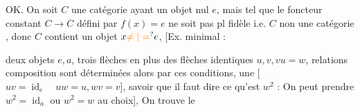 
OK. On soit \(C\) une catégorie ayant un objet nul  \(e\), mais tel que le foncteur constant  \(C\longrightarrow C\) défini par \(f(x)=e\) ne soit pas pl fidèle i.e. \(C\) non une catégorie , donc \(C\) contient un objet \(x\unsure{\ne|=}e\), [Ex. minimal :


deux objets \(e,a\), trois flèches en plus des flèches identiques \(u,v,vu=w\), relations  composition sont déterminées  alors par ces conditions,  une [\(uv=\operatorname{id}_e\quad uw=u,wv=v\)], savoir que il faut dire ce qu'est \(w^2\) : On peut prendre \(w^2=\operatorname{id}_a\) ou \(w^2=w\) au choix], On trouve le
